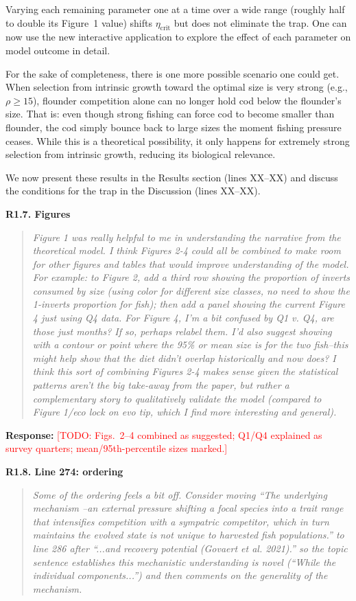 \documentclass[11pt]{article}
\newenvironment{revcomment}[1]
  {\par\medskip\noindent\textbf{#1}\par\begin{quote}\itshape\color{commentgrey}}
  {\end{quote}}
\newcommand{\response}{\par\noindent\textbf{Response:} }
\newcommand{\todo}[1]{\textcolor{red}{[TODO: #1]}}
\begin{document}
Varying each remaining parameter one at a time over a wide range (roughly half to double its Figure~1 value) shifts $\eta_{\text{crit}}$ but does not eliminate the trap. One can now use the new interactive application to explore the effect of each parameter on model outcome in detail.

For the sake of completeness, there is one more possible scenario one could get. When selection from intrinsic growth toward the optimal size is very strong (e.g., $\rho \ge 15$), flounder competition alone can no longer hold cod below the flounder's size. That is: even though strong fishing can force cod to become smaller than flounder, the cod simply bounce back to large sizes the moment fishing pressure ceases. While this is a theoretical possibility, it only happens for extremely strong selection from intrinsic growth, reducing its biological relevance.

We now present these results in the Results section (lines XX--XX) and discuss the conditions for the trap in the Discussion (lines XX--XX).

\begin{revcomment}{R1.7. Figures}
Figure 1 was really helpful to me in understanding the narrative from the theoretical model. I think Figures 2-4 could all be combined to make room for other figures and tables that would improve understanding of the model. For example: to Figure 2, add a third row showing the proportion of inverts consumed by size (using color for different size classes, no need to show the 1-inverts proportion for fish); then add a panel showing the current Figure 4 just using Q4 data. For Figure 4, I'm a bit confused by Q1 v. Q4, are those just months? If so, perhaps relabel them. I'd also suggest showing with a contour or point where the 95\% or mean size is for the two fish--this might help show that the diet didn't overlap historically and now does? I think this sort of combining Figures 2-4 makes sense given the statistical patterns aren't the big take-away from the paper, but rather a complementary story to qualitatively validate the model (compared to Figure 1/eco lock on evo tip, which I find more interesting and general).
\end{revcomment}

\response \todo{Figs.~2--4 combined as suggested; Q1/Q4 explained as survey quarters; mean/95th-percentile sizes marked.}

\begin{revcomment}{R1.8. Line 274: ordering}
Some of the ordering feels a bit off. Consider moving ``The underlying mechanism --an external pressure shifting a focal species into a trait range that intensifies competition with a sympatric competitor, which in turn maintains the evolved state is not unique to harvested fish populations.'' to line 286 after ``...and recovery potential (Govaert et al. 2021).'' so the topic sentence establishes this mechanistic understanding is novel (``While the individual components...'') and then comments on the generality of the mechanism.
\end{revcomment}
\end{document}
